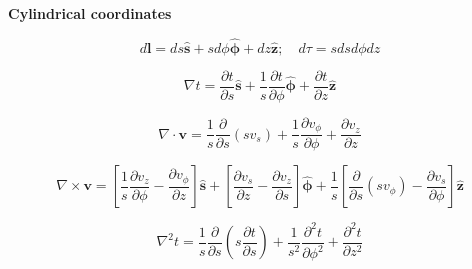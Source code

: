 {\bf Cylindrical coordinates}

\[
d \mathbf { l } = d s \hat { \mathbf { s } } + s d \phi \hat { \boldsymbol { \phi } } + d z \hat { \mathbf { z } } ; \quad d \tau = s d s d \phi d z
\]


\[
\nabla t = \frac { \partial t } { \partial s } \hat { \mathbf { s } } + \frac { 1 } { s } \frac { \partial t } { \partial \phi } \hat { \boldsymbol { \phi } } + \frac { \partial t } { \partial z } \mathbf { \hat { z } }
\]


\[
\nabla \cdot \mathbf { v } = \frac { 1 } { s } \frac { \partial } { \partial s } \left( s v _ { s } \right) + \frac { 1 } { s } \frac { \partial v _ { \phi } } { \partial \phi } + \frac { \partial v _ { z } } { \partial z }
\]


\[
\nabla \times \mathbf { v } = \left[ \frac { 1 } { s } \frac { \partial v _ { z } } { \partial \phi } - \frac { \partial v _ { \phi } } { \partial z } \right] \hat { \mathbf { s } } + \left[ \frac { \partial v _ { s } } { \partial z } - \frac { \partial v _ { z } } { \partial s } \right] \hat { \boldsymbol { \phi } } + \frac { 1 } { s } \left[ \frac { \partial } { \partial s } \left( s v _ { \phi } \right) - \frac { \partial v _ { s } } { \partial \phi } \right] \hat { \mathbf { z } }
\]


\[
\nabla ^ { 2 } t = \frac { 1 } { s } \frac { \partial } { \partial s } \left( s \frac { \partial t } { \partial s } \right) + \frac { 1 } { s ^ { 2 } } \frac { \partial ^ { 2 } t } { \partial \phi ^ { 2 } } + \frac { \partial ^ { 2 } t } { \partial z ^ { 2 } }
\]


